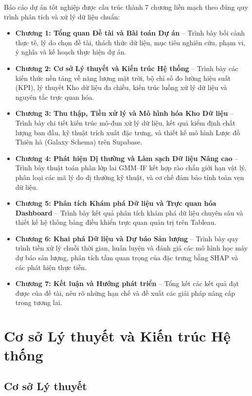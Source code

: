 \documentclass[12pt, a4paper]{report}
\begin{document}
Báo cáo dự án tốt nghiệp được cấu trúc thành 7 chương liền mạch theo đúng quy trình phân tích và xử lý dữ liệu chuẩn:
\begin{itemize}[noitemsep]
    \item \textbf{Chương 1: Tổng quan Đề tài và Bài toán Dự án} -- Trình bày bối cảnh thực tế, lý do chọn đề tài, thách thức dữ liệu, mục tiêu nghiên cứu, phạm vi, ý nghĩa và kế hoạch thực hiện dự án.
    \item \textbf{Chương 2: Cơ sở Lý thuyết và Kiến trúc Hệ thống} -- Trình bày các kiến thức nền tảng về năng lượng mặt trời, bộ chỉ số đo lường hiệu suất (KPI), lý thuyết Kho dữ liệu đa chiều, kiến trúc luồng xử lý dữ liệu và nguyên tắc trực quan hóa.
    \item \textbf{Chương 3: Thu thập, Tiền xử lý và Mô hình hóa Kho Dữ liệu} -- Trình bày chi tiết kiến trúc mô-đun xử lý dữ liệu, kết quả kiểm định chất lượng ban đầu, kỹ thuật trích xuất đặc trưng, và thiết kế mô hình Lược đồ Thiên hà (Galaxy Schema) trên Supabase.
    \item \textbf{Chương 4: Phát hiện Dị thường và Làm sạch Dữ liệu Nâng cao} -- Trình bày thuật toán phân lớp lai GMM--IF kết hợp rào chắn giới hạn vật lý, phân loại các mã lý do dị thường kỹ thuật, và cơ chế đảm bảo tính toàn vẹn dữ liệu.
    \item \textbf{Chương 5: Phân tích Khám phá Dữ liệu và Trực quan hóa Dashboard} -- Trình bày kết quả phân tích khám phá dữ liệu chuyên sâu và thiết kế hệ thống bảng điều khiển trực quan quản trị trên Tableau.
    \item \textbf{Chương 6: Khai phá Dữ liệu và Dự báo Sản lượng} -- Trình bày quy trình tiền xử lý chuỗi thời gian, huấn luyện và đánh giá các mô hình học máy dự báo sản lượng, phân tích tầm quan trọng của đặc trưng bằng SHAP và các phát hiện thực tiễn.
    \item \textbf{Chương 7: Kết luận và Hướng phát triển} -- Tổng kết các kết quả đạt được của đề tài, nêu rõ những hạn chế và đề xuất các giải pháp nâng cấp trong tương lai.
\end{itemize}

\newpage
\chapter{Cơ sở Lý thuyết và Kiến trúc Hệ thống}
\label{chap:lythuyet}

\section{Cơ sở Lý thuyết}
\label{sec:co_so_ly_thuyet}
\end{document}
